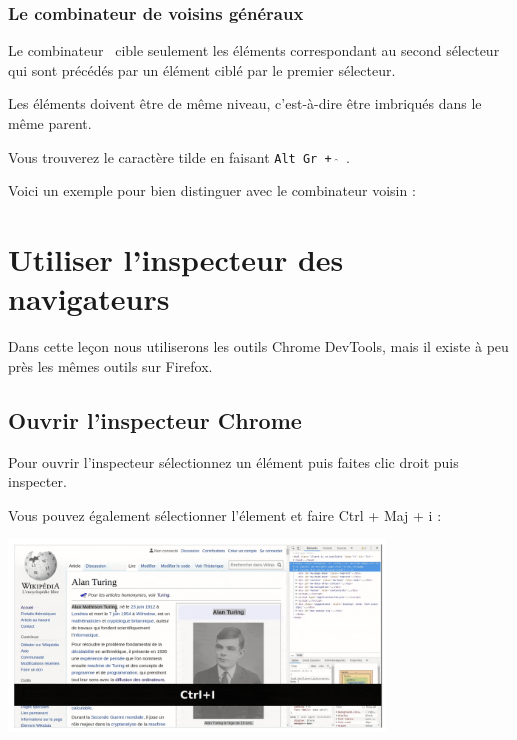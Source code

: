 \documentclass[a4paper]{article}
\begin{document}
\subsubsection{Le combinateur de voisins généraux}
Le combinateur~ cible seulement les éléments correspondant au second sélecteur qui sont précédés par un élément ciblé par le premier sélecteur.

Les éléments doivent être de même niveau, c'est-à-dire être imbriqués dans le même parent.

Vous trouverez le caractère tilde en faisant {\tt Alt Gr + $\hat{}$ }.

Voici un exemple pour bien distinguer avec le combinateur voisin :


\section{Utiliser l'inspecteur des navigateurs}
Dans cette leçon nous utiliserons les outils Chrome DevTools, mais il existe à peu près les mêmes outils sur Firefox.

\subsection{Ouvrir l'inspecteur Chrome}
Pour ouvrir l'inspecteur sélectionnez un élément puis faites clic droit puis inspecter.

Vous pouvez également sélectionner l'élement et faire Ctrl + Maj + i :

\begin{center}
\includegraphics[width=10cm]{images/image09.png}
\end{center}
\end{document}
